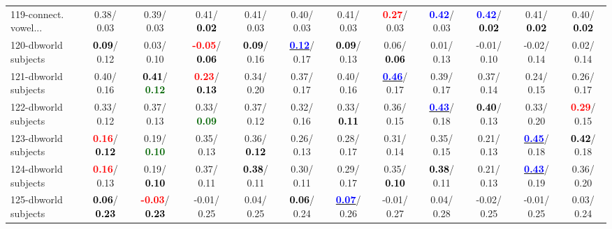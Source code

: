 \begin{table}[h]
\begin{center}
{\begin{tabular}{lc|c|c|c|c|c|c|c|c|c|c}
119-connect. vowel... &   0.38/  0.03 &   0.39/  0.03 &   0.41/\textcolor{black}{\textbf{  0.02}} &   0.41/  0.03 &   0.40/  0.03 &   0.41/  0.03 & \textcolor{red}{\textbf{  0.27}}/  0.03 & \textcolor{blue}{\textbf{  0.42}}/  0.03 & \textcolor{blue}{\textbf{  0.42}}/\textcolor{black}{\textbf{  0.02}} &   0.41/\textcolor{black}{\textbf{  0.02}} &   0.40/\textcolor{black}{\textbf{  0.02}} \\
120-dbworld subjects & \textcolor{black}{\textbf{  0.09}}/  0.12 &   0.03/  0.10 & \textcolor{red}{\textbf{ -0.05}}/\textcolor{black}{\textbf{  0.06}} & \textcolor{black}{\textbf{  0.09}}/  0.16 & \underline{\textcolor{blue}{\textbf{  0.12}}}/  0.17 & \textcolor{black}{\textbf{  0.09}}/  0.13 &   0.06/\textcolor{black}{\textbf{  0.06}} &   0.01/  0.13 &  -0.01/  0.10 &  -0.02/  0.14 &   0.02/  0.14 \\
121-dbworld subjects &   0.40/  0.16 & \textcolor{black}{\textbf{  0.41}}/\textcolor{darkgreen}{\textbf{  0.12}} & \textcolor{red}{\textbf{  0.23}}/\textcolor{black}{\textbf{  0.13}} &   0.34/  0.20 &   0.37/  0.17 &   0.40/  0.16 & \underline{\textcolor{blue}{\textbf{  0.46}}}/  0.17 &   0.39/  0.17 &   0.37/  0.14 &   0.24/  0.15 &   0.26/  0.17 \\
122-dbworld subjects &   0.33/  0.12 &   0.37/  0.13 &   0.33/\textcolor{darkgreen}{\textbf{  0.09}} &   0.37/  0.12 &   0.32/  0.16 &   0.33/\textcolor{black}{\textbf{  0.11}} &   0.36/  0.15 & \underline{\textcolor{blue}{\textbf{  0.43}}}/  0.18 & \textcolor{black}{\textbf{  0.40}}/  0.13 &   0.33/  0.20 & \textcolor{red}{\textbf{  0.29}}/  0.15 \\
123-dbworld subjects & \textcolor{red}{\textbf{  0.16}}/\textcolor{black}{\textbf{  0.12}} &   0.19/\textcolor{darkgreen}{\textbf{  0.10}} &   0.35/  0.13 &   0.36/\textcolor{black}{\textbf{  0.12}} &   0.26/  0.13 &   0.28/  0.17 &   0.31/  0.14 &   0.35/  0.15 &   0.21/  0.13 & \underline{\textcolor{blue}{\textbf{  0.45}}}/  0.18 & \textcolor{black}{\textbf{  0.42}}/  0.18 \\
124-dbworld subjects & \textcolor{red}{\textbf{  0.16}}/  0.13 &   0.19/\textcolor{black}{\textbf{  0.10}} &   0.37/  0.11 & \textcolor{black}{\textbf{  0.38}}/  0.11 &   0.30/  0.11 &   0.29/  0.17 &   0.35/\textcolor{black}{\textbf{  0.10}} & \textcolor{black}{\textbf{  0.38}}/  0.11 &   0.21/  0.13 & \underline{\textcolor{blue}{\textbf{  0.43}}}/  0.19 &   0.36/  0.20 \\ \hline
125-dbworld subjects & \textcolor{black}{\textbf{  0.06}}/\textcolor{black}{\textbf{  0.23}} & \textcolor{red}{\textbf{ -0.03}}/\textcolor{black}{\textbf{  0.23}} &  -0.01/  0.25 &   0.04/  0.25 & \textcolor{black}{\textbf{  0.06}}/  0.24 & \underline{\textcolor{blue}{\textbf{  0.07}}}/  0.26 &  -0.01/  0.27 &   0.04/  0.28 &  -0.02/  0.25 &  -0.01/  0.25 &   0.03/  0.24 \\

\end{tabular}}
\end{center}
\end{table}
